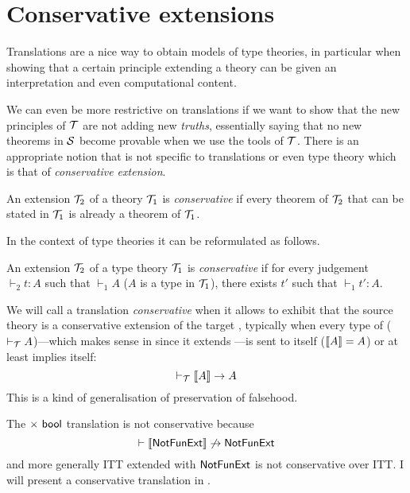 \section{Conservative extensions}

Translations are a nice way to obtain models of type theories, in particular
when showing that a certain principle extending a theory can be given an
interpretation and even computational content.

We can even be more restrictive on translations if we want to show that the new
principles of \(\mathcal{T}\) are not adding new \emph{truths}, essentially saying that
no new theorems in \(\mathcal{S}\) become provable when we use the tools of \(\mathcal{T}\).
There is an appropriate notion that is not specific to translations or even
type theory which is that of \emph{conservative extension}.

\begin{definition}
  An extension \(\mathcal{T}_2\) of a theory \(\mathcal{T}_1\) is \emph{conservative} if every
  theorem of \(\mathcal{T}_2\) that can be stated in \(\mathcal{T}_1\) is already a theorem of
  \(\mathcal{T}_1\).
\end{definition}

In the context of type theories it can be reformulated as follows.

\begin{definition}
  An extension \(\mathcal{T}_2\) of a type theory \(\mathcal{T}_1\) is \emph{conservative} if
  for every judgement \(\vdash_2 t : A\) such that \(\vdash_1 A\)
  (\ie \(A\) is a type in \(\mathcal{T}_1\)), there exists \(t'\) such that
  \(\vdash_1 t' : A\).
\end{definition}

We will call a translation \emph{conservative} when it allows to exhibit that
the source theory \cS is a conservative extension of the target \cT, typically
when every type of \cT (\ie \(\vdash_\mathcal{T} A\))---which makes sense in \cS since
it extends \cT---is sent to itself (\(\llbracket A \rrbracket = A\)) or at least implies
itself:
\[
  \vdash_\mathcal{T} \llbracket A \rrbracket \to A
\]
This is a kind of generalisation of preservation of falsehood.

The \(\times\ \mathsf{bool}\) translation is not conservative because
\[
  \vdash \llbracket \mathsf{NotFunExt} \rrbracket \not\to \mathsf{NotFunExt}
\]
and more generally \acrshort{ITT} extended with \(\mathsf{NotFunExt}\) is not
conservative over \acrshort{ITT}.
I will present a conservative translation in .

